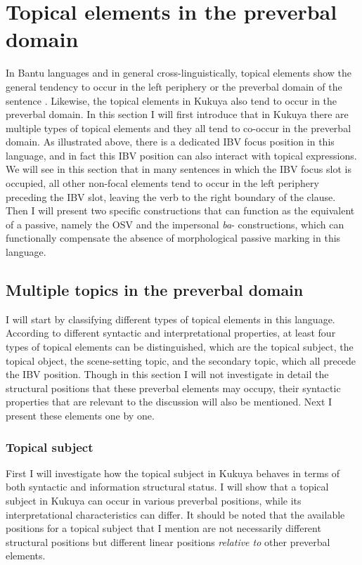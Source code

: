 \documentclass[output=paper,colorlinks,citecolor=brown,
]{langscibook}
\begin{document}
\section{Topical elements in the preverbal domain}\label{teke:sec:4}
In Bantu languages and in general cross-linguistically, topical elements show the general tendency to occur in the left periphery or the preverbal domain of the sentence \citep{Gundel1988, Henderson2006, vanderWal2009a, vanderWal2015, KerrEtAl2023}. Likewise, the topical elements in Kukuya also tend to occur in the preverbal domain. In this section I will first introduce that in Kukuya there are multiple types of topical elements and they all tend to co-occur in the preverbal domain. As illustrated above, there is a dedicated IBV focus position in this language, and in fact this IBV position can also interact with topical expressions. We will see in this section that in many sentences in which the IBV focus slot is occupied, all other non-focal elements tend to occur in the left periphery preceding the IBV slot, leaving the verb to the right boundary of the clause. Then I will present two specific constructions that can function as the equivalent of a passive, namely the OSV and the impersonal \textit{ba}- constructions, which can functionally compensate the absence of morphological passive marking in this language.
\subsection{Multiple topics in the preverbal domain}\label{teke:sec:4.1}
I will start by classifying different types of topical elements in this language. According to different syntactic and interpretational properties, at least four types of topical elements can be distinguished, which are the topical subject, the topical object, the scene-setting topic, and the secondary topic, which all precede the IBV position. Though in this section I will not investigate in detail the structural positions that these preverbal elements may occupy, their syntactic properties that are relevant to the discussion will also be mentioned. Next I present these elements one by one.
\subsubsection{Topical subject}\label{teke:sec:4.1.1}
First I will investigate how the topical subject in Kukuya behaves in terms of both syntactic and information structural status. I will show that a topical subject in Kukuya can occur in various preverbal positions, while its interpretational characteristics can differ. It should be noted that the available positions for a topical subject that I mention are not necessarily different structural positions but different linear positions \textit{relative to} other preverbal elements.
\end{document}
